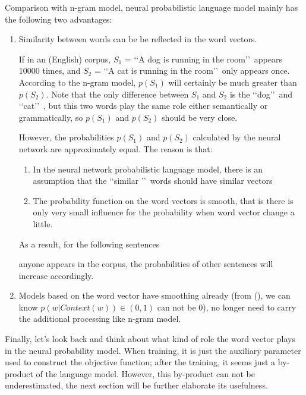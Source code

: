Comparison with n-gram model, neural probabilistic language model mainly has the following two advantages:

\begin{enumerate}
\item Similarity between words can be be reflected in the word vectors.

\tab If in an (English) corpus, $S_1$ = \lq\lq A dog is running in the room\rq\rq\ appears 10000 times, and $S_2$ = \lq\lq A cat is running in the room\rq\rq\ only appears once. According to the n-gram model, $p(S_1)$ will certainly be much greater than $p(S_2)$. Note that the only difference between $S_1$ and $S_2$ is the \lq\lq dog\rq\rq\ and \lq\lq cat\rq\rq\ , but this two words play the same role either semantically or grammatically, so $p(S_1)$ and $p(S_2)$ should be very close.

\tab However, the probabilities $p(S_1)$ and $p(S_2)$ calculated by the neural network are approximately equal. The reason is that: 
\begin{enumerate}
\item In the neural network probabilistic language model, there is an assumption that the \lq\lq similar \rq\rq\ words should have similar vectors
\item The probability function on the word vectors is smooth, that is there is only very small influence for the probability when word vector change a little. 
\end{enumerate}
As a result, for the following sentences
anyone appears in the corpus, the probabilities of other sentences will increase accordingly.
\item Models based on the word vector have smoothing already (from (), we can know $p(w|Context(w))\in(0,1)$ can not be $0$), no longer need to carry the additional processing like n-gram model.
\end{enumerate}

Finally, let's look back and think about what kind of role the word vector plays in the neural probability model. When training, it is just the auxiliary parameter used to construct the objective function; after the training, it seems just a by-product of the language model. However, this by-product can not be underestimated, the next section will be further elaborate its usefulness.
